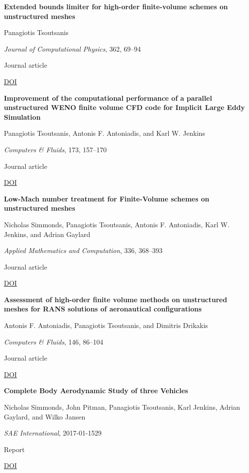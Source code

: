 \documentclass[11pt,a4paper]{article}
\newlength{\cventrysep}
\newenvironment{cventry}{%
  \par\noindent\begin{minipage}{\linewidth}
  \RaggedRight\fontsize{9.8}{12.5}\selectfont
}{\end{minipage}\par\addvspace{\cventrysep}}
\newcommand{\cvtitle}[1]{{\bfseries #1\par}\vspace{1pt}}
\newcommand{\cvdetail}[1]{{#1\par}\vspace{1pt}}
\newcommand{\cvmeta}[1]{{\fontsize{9}{11.5}\selectfont\color{Muted}#1\par}\vspace{1pt}}
\newcommand{\cvlinks}[1]{{\fontsize{9}{11.5}\selectfont #1\par}}
\newcommand{\cvyear}[1]{{\color{Teal}\bfseries\fontsize{11}{13}\selectfont #1\par}\vspace{6pt}}
\begin{document}
\begin{cventry}
\cvtitle{Extended bounds limiter for high-order finite-volume schemes on unstructured meshes}
\cvdetail{Panagiotis Tsoutsanis}
\cvmeta{\textit{Journal of Computational Physics}, 362, 69--94\par Journal article}
\cvlinks{\href{https://doi.org/10.1016/j.jcp.2018.02.009}{DOI}}
\end{cventry}

\begin{cventry}
\cvtitle{Improvement of the computational performance of a parallel unstructured WENO finite volume CFD code for Implicit Large Eddy Simulation}
\cvdetail{Panagiotis Tsoutsanis, Antonis F. Antoniadis, and Karl W. Jenkins}
\cvmeta{\textit{Computers \& Fluids}, 173, 157--170\par Journal article}
\cvlinks{\href{https://doi.org/10.1016/j.compfluid.2018.03.012}{DOI}}
\end{cventry}

\begin{cventry}
\cvtitle{Low-Mach number treatment for Finite-Volume schemes on unstructured meshes}
\cvdetail{Nicholas Simmonds, Panagiotis Tsoutsanis, Antonis F. Antoniadis, Karl W. Jenkins, and Adrian Gaylard}
\cvmeta{\textit{Applied Mathematics and Computation}, 336, 368--393\par Journal article}
\cvlinks{\href{https://doi.org/10.1016/j.amc.2018.04.076}{DOI}}
\end{cventry}

\begin{cventry}
\cvyear{2017}
\cvtitle{Assessment of high-order finite volume methods on unstructured meshes for RANS solutions of aeronautical configurations}
\cvdetail{Antonis F. Antoniadis, Panagiotis Tsoutsanis, and Dimitris Drikakis}
\cvmeta{\textit{Computers \& Fluids}, 146, 86--104\par Journal article}
\cvlinks{\href{https://doi.org/10.1016/j.compfluid.2017.01.002}{DOI}}
\end{cventry}

\begin{cventry}
\cvtitle{Complete Body Aerodynamic Study of three Vehicles}
\cvdetail{Nicholas Simmonds, John Pitman, Panagiotis Tsoutsanis, Karl Jenkins, Adrian Gaylard, and Wilko Jansen}
\cvmeta{\textit{SAE International}, 2017-01-1529\par Report}
\cvlinks{\href{https://doi.org/10.4271/2017-01-1529}{DOI}}
\end{cventry}
\end{document}
